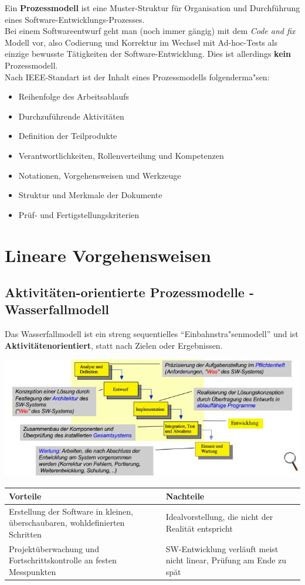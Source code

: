 \documentclass[a4paper,12pt]{article}
\begin{document}
	Ein \textbf{Prozessmodell} ist eine Muster-Struktur für Organisation und Durchführung eines Software-Entwicklungs-Prozesses.\\
	Bei einem Softwareentwurf geht man (noch immer gängig) mit dem \textit{Code and fix} Modell vor, also Codierung und Korrektur im Wechsel mit Ad-hoc-Tests als einzige bewusste Tätigkeiten der Software-Entwicklung. Dies ist allerdings \textbf{kein} Prozessmodell.\\
	Nach IEEE-Standart ist der Inhalt eines Prozessmodells folgenderma"sen:
	\begin{itemize}
		\item Reihenfolge des Arbeitsablaufs
		\item Durchzuführende Aktivitäten
		\item Definition der Teilprodukte
		\item Verantwortlichkeiten, Rollenverteilung und Kompetenzen
		\item Notationen, Vorgehensweisen und Werkzeuge
		\item Struktur und Merkmale der Dokumente
		\item Prüf- und Fertigstellungskriterien
	\end{itemize}
	\section{Lineare Vorgehensweisen}
	
	\subsection*{Aktivitäten-orientierte Prozessmodelle - Wasserfallmodell}
	Das Wasserfallmodell ist ein streng sequentielles "`Einbahnstra"senmodell"' und ist \textbf{Aktivitätenorientiert}, statt nach Zielen oder Ergebnissen. 
	\begin{center}
		\includegraphics[width=\linewidth]{pics/wasserfallmodell.jpg}
	\end{center}
\begin{center}
	\begin{tabularx}{13cm}{X|X}
		\hline 
		Vorteile & Nachteile\\ \hline \hline
		Erstellung der Software in kleinen, überschaubaren, wohldefinierten Schritten & Idealvorstellung, die nicht der Realität entspricht \\ \hline
		Projektüberwachung und Fortschrittskontrolle an festen Messpunkten & SW-Entwicklung verläuft meist nicht linear, Prüfung am Ende zu spät 
	\end{tabularx}
\end{center}
\end{document}
